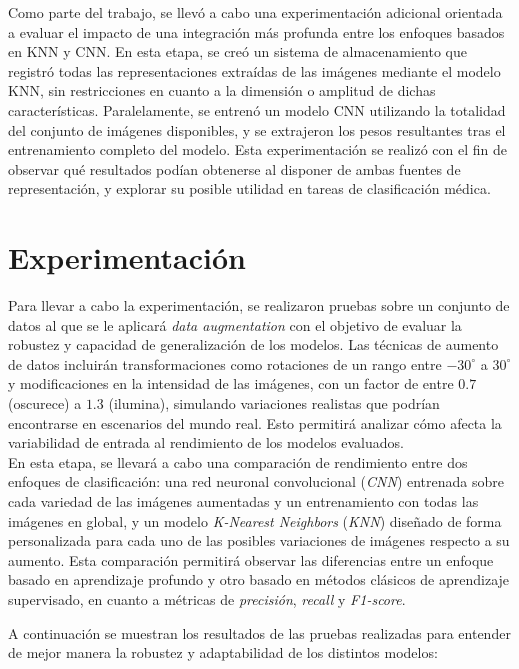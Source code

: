 \documentclass[12pt]{article} %
\begin{document}
Como parte del trabajo, se llevó a cabo una experimentación adicional orientada a evaluar el impacto de una integración más profunda entre los enfoques basados en KNN y CNN. En esta etapa, se creó un sistema de almacenamiento que registró todas las representaciones extraídas de las imágenes mediante el modelo KNN, sin restricciones en cuanto a la dimensión o amplitud de dichas características. Paralelamente, se entrenó un modelo CNN utilizando la totalidad del conjunto de imágenes disponibles, y se extrajeron los pesos resultantes tras el entrenamiento completo del modelo. Esta experimentación se realizó con el fin de observar qué resultados podían obtenerse al disponer de ambas fuentes de representación, y explorar su posible utilidad en tareas de clasificación médica. 

 

\section{Experimentación}
Para llevar a cabo la experimentación, se realizaron pruebas sobre un conjunto de datos al que se le aplicará \textit{data augmentation} con el objetivo de evaluar la robustez y capacidad de generalización de los modelos. Las técnicas de aumento de datos incluirán transformaciones como rotaciones de un rango entre $-30^\circ$ a $30^\circ$ y modificaciones en la intensidad de las imágenes, con un factor de entre $0.7$ (oscurece) a $1.3$ (ilumina), simulando variaciones realistas que podrían encontrarse en escenarios del mundo real. Esto permitirá analizar cómo afecta la variabilidad de entrada al rendimiento de los modelos evaluados. \\

En esta etapa, se llevará a cabo una comparación de rendimiento entre dos enfoques de clasificación: una red neuronal convolucional (\textit{CNN}) entrenada sobre cada variedad de las imágenes aumentadas y un entrenamiento con todas las imágenes en global, y un modelo \textit{K-Nearest Neighbors} (\textit{KNN}) diseñado de forma personalizada para cada uno de las posibles variaciones de imágenes respecto a su aumento. Esta comparación permitirá observar las diferencias entre un enfoque basado en aprendizaje profundo y otro basado en métodos clásicos de aprendizaje supervisado, en cuanto a métricas de \textit{precisión}, \textit{recall} y \textit{F1-score}.

A continuación se muestran los resultados de las pruebas realizadas para entender de mejor manera la robustez y adaptabilidad de los distintos modelos:
\end{document}
